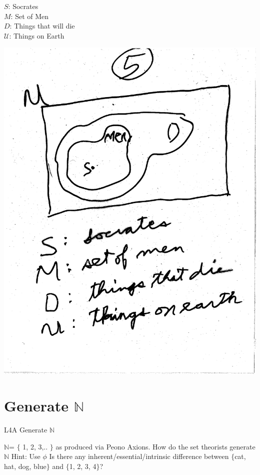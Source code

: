 \documentclass[10pt,a4paper]{article}
\begin{document}
$S$: Socrates\\
$M$: Set of Men\\
$D$: Things that will die\\
$\mathcal{U}$: Things on Earth

\includegraphics[scale=.5]{Pages/ST_5} 







\section{Generate $\mathbb{N}$}


\begin{Large}
L4A Generate $\mathbb{N}$
\end{Large}

\textit{$\mathbb{N}$}= $\lbrace$ 1, 2, 3,.. $\rbrace$ as produced via Peono Axions. How do the set theorists generate $\mathbb{N}$ Hint: Use 
$\phi$ Is there any inherent/essential/intrinsic difference between $\lbrace$cat, hat, dog, blue$\rbrace$ and $\lbrace$1, 2, 3, 4$\rbrace$?
\end{document}

